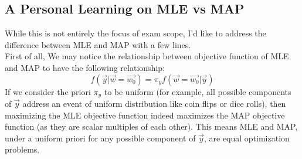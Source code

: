 \subsection{A Personal Learning on MLE vs MAP}
While this is not entirely the focus of exam scope, I'd like to address the difference between MLE and MAP with a few lines. \\
First of all, We may notice the relationship between objective function of MLE and MAP to have the following relationship:
\[
    f(\vec{y} | \vec{w} = \vec{w_0}) = \pi_y f(\vec{w} = \vec{w_0} | \vec{y})
\]
If we consider the priori $\pi_y$ to be uniform (for example, all possible components of $\vec{y}$ address an event of uniform distribution like coin flips or dice rolls), then maximizing the MLE objective function indeed maximizes the MAP objective function (as they are scalar multiples of each other).
This means MLE and MAP, under a uniform priori for any possible component of $\vec{y}$, are equal optimization problems.
